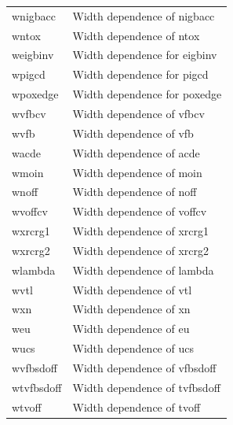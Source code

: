 \begin{longtable}{l l}
{\small wnigbacc} & {\small Width dependence of nigbacc} \\
{\small wntox} & {\small Width dependence of ntox} \\
{\small weigbinv} & {\small Width dependence for eigbinv} \\
{\small wpigcd} & {\small Width dependence for pigcd} \\
{\small wpoxedge} & {\small Width dependence for poxedge} \\
{\small wvfbcv} & {\small Width dependence of vfbcv} \\
{\small wvfb} & {\small Width dependence of vfb} \\
{\small wacde} & {\small Width dependence of acde} \\
{\small wmoin} & {\small Width dependence of moin} \\
{\small wnoff} & {\small Width dependence of noff} \\
{\small wvoffcv} & {\small Width dependence of voffcv} \\
{\small wxrcrg1} & {\small Width dependence of xrcrg1} \\
{\small wxrcrg2} & {\small Width dependence of xrcrg2} \\
{\small wlambda} & {\small Width dependence of lambda} \\
{\small wvtl} & {\small Width dependence of vtl} \\
{\small wxn} & {\small Width dependence of xn} \\
{\small weu} & {\small Width dependence of eu} \\
{\small wucs} & {\small Width dependence of ucs} \\
{\small wvfbsdoff} & {\small Width dependence of vfbsdoff} \\
{\small wtvfbsdoff} & {\small Width dependence of tvfbsdoff} \\
{\small wtvoff} & {\small Width dependence of tvoff} \\


\end{longtable}
